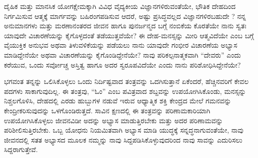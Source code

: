 \newpage
\begin{mananam}{}
\nfntmtxt ದೈಹಿಕ ಮತ್ತು ಮಾನಸಿಕ ಯೋಗಕ್ಷೇಮಕ್ಕಾಗಿ ವಿವಿಧ ವೈದ್ಯಕೀಯ ವಿಜ್ಞಾನಗಳಿರುವಂತೆಯೇ, ಭೌತಿಕ ದೇಹದಿಂದ ನಿರ್ಗಮಿಸುವ ಆತ್ಮಕ್ಕೆ ಮಾರ್ಗವನ್ನು ಬಹಿರಂಗಪಡಿಸುವ  ಆದರೆ, ಅಷ್ಟು ಪ್ರಸಿದ್ಧವಲ್ಲದ ವಿಜ್ಞಾನಗಳಿರಬಹುದೇ ? 
ನನ್ನ ಅನುಮಾನಗಳು ಮತ್ತು ಮರಣಾನಂತರದ ಜೀವನ ಹಾಗೂ ಪುನರ್ಜನ್ಮದ ಬಗ್ಗೆ ನಂಬಿಕೆಯ ಕೊರತೆಯೇ ನಾನು ಸ್ವತಃ ಯಾವುದೇ ವಿಚಾರಣೆಯನ್ನು ಕೈಗೊಳ್ಳದಂತೆ ತಡೆಯುತ್ತವೆಯೇ?  ಈ ದೇಹ-ಮನಸ್ಸನ್ನು ಮೀರಿ ಆತ್ಮವಿದೆಯೇ ಎಂಬ ಬಗ್ಗೆ ವೈಯುಕ್ತಿಕ ಅನುಭವ ಅಥವಾ ತಿಳುವಳಿಕೆಯನ್ನು ಪಡೆಯಲು ನಾನು ಯಾವುದೇ ಗಂಭೀರ ವಿಚಾರಣೆಯ ಅಭ್ಯಾಸ ಮಾಡಿದ್ದೇನೆಯೇ ಅಥವಾ ವಿಚಾರಣೆಯನ್ನು ಕೈಗೊಂಡಿದ್ದೇನೆಯೇ?  ನಾವು ಪರಿಕಲ್ಪನಾತ್ಮಕವಾಗಿ “ದೇವರು” ಎಂದು ಕರೆಯುವ, ಒಂದು ಸರ್ವೋಚ್ಚ ಅಸ್ತಿತ್ವ ಹಾಗೂ ಅದರ ಸ್ವರೂಪವಿದೆಯೇ ಎಂದು ನಾನು ಪರಿಶೋಧಿಸಿದ್ದೇನೆಯೇ?
\end{mananam}
\sReflect
\begin{inspiration}{}
\nfntmtxt \footnotesize ಭಗವಂತ ತನ್ನನ್ನು ಒಲಿಸಿಕೊಳ್ಳಲು ಒಂದು ನಿರ್ದಿಷ್ಟವಾದ ತಂತ್ರವನ್ನು ಒದಗಿಸುತ್ತಾನೆ ಏಕೆಂದರೆ, ಹೆಚ್ಚಿನವರಿಗೆ ಕೇವಲ ಪದಗಳು ಸಾಕಾಗುವುದಿಲ್ಲ. ಈ ತಂತ್ರವು, “ಓಂ” ಎಂಬ ಪವಿತ್ರವಾದ ಶಬ್ದವನ್ನು ಉಪಯೋಗಿಸಿಕೊಂಡು, ಮನಸ್ಸನ್ನು ನಿಶ್ಚಲಗೊಳಿಸಿ, ದೇಹದಲ್ಲಿ ಎರಡು ಹುಬ್ಬುಗಳ ನಡುವೆ ಇರುವ ಆಧ್ಯಾತ್ಮಿಕ ಶಕ್ತಿ ಕೇಂದ್ರದ ಮೇಲೆ ಗಮನವನ್ನು ಕೇಂದ್ರೀಕರಿಸುವುದನ್ನು ಒಳಗೊಂಡಿರುತ್ತದೆ. ಸಾವಿನ ಕ್ಷಣದಲ್ಲಿ ಈ ತಂತ್ರವನ್ನು ಪರಿಣಾಮಕಾರಿಯಾಗಿ ಉಪಯೋಗಿಸಿಕೊಳ್ಳಲು ಜೀವನವಿಡೀ ಅದನ್ನು ಅಭ್ಯಾಸ ಮಾಡುತ್ತಿರಬೇಕು ಮತ್ತು ಅದರ ಪರಿಣಾಮವನ್ನು ಪರಿಶೀಲಿಸುತ್ತಿರಬೇಕು.
ಒಬ್ಬ ಯೋಧನು ನಿಯಮಿತವಾಗಿ ಅಭ್ಯಾಸ ಮಾಡಿ ಯುದ್ಧಕ್ಕೆ ಸನ್ನದ್ಧನಾಗುವಂತೆಯೇ, ನಾವು ಜೀವನದಲ್ಲಿ ಸತತ ಅಭ್ಯಾಸದ ಮೂಲಕ ನಮ್ಮನ್ನು ನಾವು ಸಿದ್ದಪಡಿಸಿಕೊಳ್ಳುವುದರಿಂದ ನಾವು ಸಾವನ್ನು ಎದುರಿಸಲು ಸಿದ್ದರಾಗುತ್ತೇವೆ. 
\end{inspiration}
\newpage


